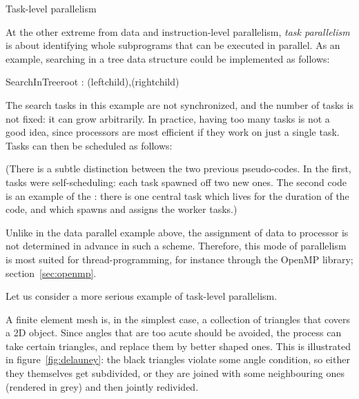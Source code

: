  {Task-level parallelism}
\label{sec:task-parallel}

At the other extreme from data and instruction-level parallelism,
\emph{task parallelism} is about identifying whole subprograms
that can be executed in parallel. As an example, searching in a tree
data structure could be implemented as follows:

\begin{displayprocedure}{SearchInTree}{root}
  {\parl: \search(leftchild),\search(rightchild)}
\end{displayprocedure}

The search tasks in this example are not synchronized, and the number
of tasks is not fixed: it can grow arbitrarily. In practice, having
too many tasks is not a good idea, since processors are most efficient
if they work on just a single task. Tasks can then be scheduled as
follows:

\begin{displayalgorithm}
\end{displayalgorithm}

(There is a subtle distinction between the two previous
pseudo-codes. In the first, tasks were self-scheduling: each task
spawned off two new ones. The second code is an example of
the : there is one central task which
lives for the duration of the code, and which spawns and assigns the
worker tasks.)

Unlike in the data parallel example above, the assignment of data to
processor is not determined in advance in such a scheme. Therefore,
this mode of parallelism is most suited for thread-programming, for
instance through the OpenMP library; section~\ref{sec:openmp}.

Let us consider a more serious example of task-level parallelism.

A finite element mesh is, in the simplest case, a collection of
triangles that covers a 2D object. Since angles that are too acute
should be avoided, the  process
can take certain triangles, and replace them by better shaped
ones. This is illustrated in figure~\ref{fig:delauney}: the black
triangles violate some angle condition, so either they themselves get
subdivided, or they are joined with some neighbouring ones (rendered
in grey) and then jointly redivided.

